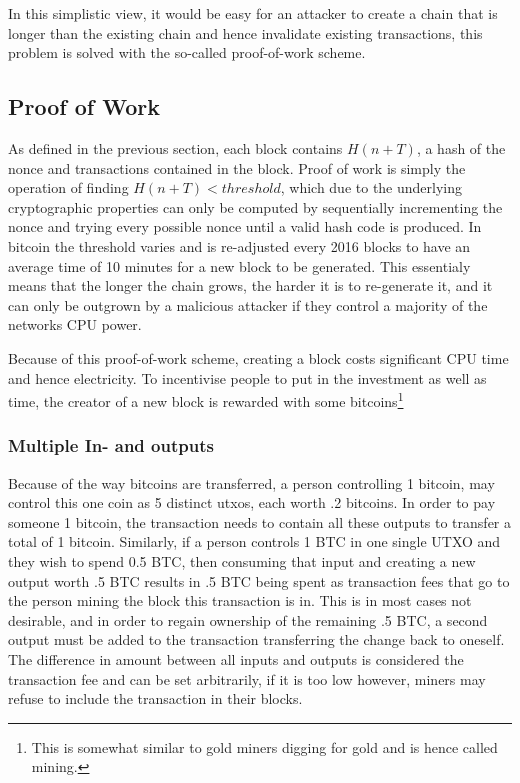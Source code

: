 \documentclass[12pt,msc,a4paper,oneside]{ucl_thesis}
\begin{document}
In this simplistic view, it would be easy for an attacker to create a chain that is longer than the existing chain and hence invalidate existing transactions, this problem is solved with the so-called proof-of-work scheme.

\subsection{Proof of Work} \label{sec:background_bitcoin:proof_of_work}
As defined in the previous section, each block contains $H(n + T)$, a hash of the nonce and transactions contained in the block. Proof of work is simply the operation of finding $H(n + T) < threshold$, which due to the underlying cryptographic properties can only be computed by sequentially incrementing the nonce and trying every possible nonce until a valid hash code is produced. In bitcoin the threshold varies and is re-adjusted every 2016 blocks to have an average time of 10 minutes for a new block to be generated. This essentialy means that the longer the chain grows, the harder it is to re-generate it, and it can only be outgrown by a malicious attacker if they control a majority of the networks CPU power.

Because of this proof-of-work scheme, creating a block costs significant CPU time and hence electricity. To incentivise people to put in the investment as well as time, the creator of a new block is rewarded with some bitcoins\footnote{This is somewhat similar to gold miners digging for gold and is hence called mining.} \cite{bitcoin:satoshi}

\subsubsection{Multiple In- and outputs} \label{sec:background_bitcoin:multiple_in_out}
Because of the way bitcoins are transferred, a person controlling 1 bitcoin, may control this one coin as 5 distinct utxos, each worth .2 bitcoins. In order to pay someone 1 bitcoin, the transaction needs to contain all these outputs to transfer a total of 1 bitcoin. Similarly, if a person controls 1 BTC in one single UTXO and they wish to spend 0.5 BTC, then consuming that input and creating a new output worth .5 BTC results in .5 BTC being spent as transaction fees that go to the person mining the block this transaction is in. This is in most cases not desirable, and in order to regain ownership of the remaining .5 BTC, a second output must be added to the transaction transferring the change back to oneself. The difference in amount between all inputs and outputs is considered the transaction fee and can be set arbitrarily, if it is too low however, miners may refuse to include the transaction in their blocks. \cite{bitcoin:satoshi}
\end{document}
